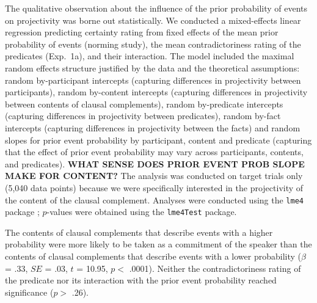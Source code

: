 \documentclass[11pt,fleqn]{article}
\newcommand{\6}{\mbox{$[\hspace*{-.6mm}[$}}
\newcommand{\9}{\mbox{$]\hspace*{-.6mm}]$}}
\begin{document}
The qualitative observation about the influence of the prior probability of events on projectivity was borne out statistically. We conducted a mixed-effects linear regression predicting certainty rating from fixed effects of the mean prior probability of events (norming study), the mean contradictoriness rating of the predicates (Exp.~1a), and their interaction. The model included the maximal random effects structure justified by the data and the theoretical assumptions: random by-participant intercepts (capturing differences in projectivity between participants), random by-content intercepts (capturing differences in projectivity between contents of clausal complements), random by-predicate intercepts (capturing differences in projectivity between predicates), random by-fact intercepts (capturing differences in projectivity between the facts) and random slopes for prior event probability by participant, content and predicate (capturing that the effect of prior event probability may vary across participants, contents, and predicates). {\bf WHAT SENSE DOES PRIOR EVENT PROB SLOPE MAKE FOR CONTENT?} The analysis was conducted on target  trials only (5,040 data points) because we were specifically interested in the projectivity of the content of the clausal complement. Analyses were conducted using the \verb|lme4| package \citep{bates2015}; $p$-values were obtained using the \verb|lme4Test| package.

The contents of clausal complements that describe events with a higher probability were more likely to be taken as a commitment of the speaker than the contents of clausal complements that describe events with a lower probability ($\beta$ = .33, $SE$ = .03, $t$ = 10.95, $p <$ .0001). Neither the contradictoriness rating of the predicate nor its interaction with the prior event probability reached significance ($p >$ .26). 
\end{document}
